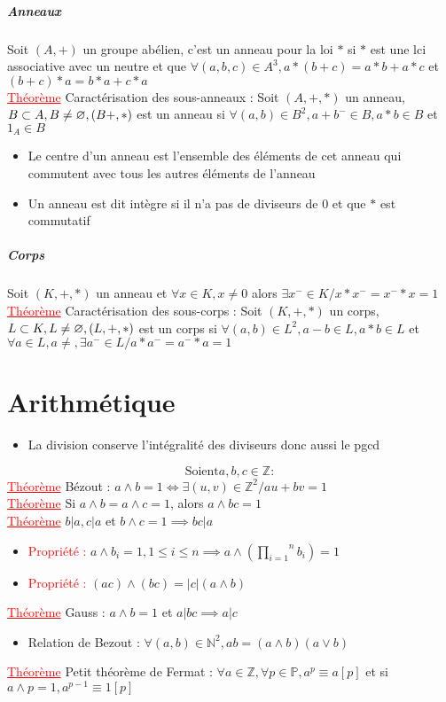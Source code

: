 \documentclass[a4paper, french]{article}
\newcommand{\N}{\mathbb{N}}
\newcommand{\Z}{\mathbb{Z}}
\newcommand{\p}{\wedge}
\newcommand{\produit}[2]{\overset{#2}{\underset{#1}{\prod}}}
\newcommand{\thm}{\textcolor{red}{\underline{Théorème} }}
\newcommand{\ppt}{\textcolor{red}{Propriété : }}
\begin{document}
	\subparagraph{Anneaux}
	Soit $(A,+)$ un groupe abélien, c'est un anneau pour la loi $*$ si $*$ est une lci associative avec un neutre et que $\forall (a,b,c)\in A^3, a*(b+c)=a*b+a*c$ et $ (b+c)*a=b*a+c*a$ \\
	 \thm Caractérisation des sous-anneaux : Soit $(A,+,*)$ un anneau, $B \subset A, B\neq \varnothing, \\ (B+,*)$ est un anneau si $\forall (a,b) \in B^2, a+b^-\in B, a*b \in B$ et $1_A \in B$
	\begin{itemize}
	  \item Le centre d'un anneau est l'ensemble des éléments de cet anneau qui commutent avec tous les autres éléments de l'anneau
	  \item Un anneau est dit intègre si il n'a pas de diviseurs de 0 et que $*$ est commutatif
	\end{itemize}

	\subparagraph{Corps}
	Soit $(K,+,*)$ un anneau et $\forall x \in K, x\neq0$ alors $\exists x^- \in K / x*x^-=x^-*x=1$
	\thm Caractérisation des sous-corps : Soit $(K,+,*)$ un corps, $L \subset K, L\neq \varnothing, \\ (L,+,*)$ est un corps si $\forall (a,b) \in L^2, a-b \in L, a*b \in L$ et $\forall a\in L, a\neq, \exists a^- \in L / a*a^-=a^-*a=1$

	\section{Arithmétique}
	\begin{itemize}
	  \item La division conserve l'intégralité des diviseurs donc aussi le pgcd
	\end{itemize}
	$$\text{Soient} a,b,c \in \Z :$$
	 \thm Bézout : $a \p b=1 \iff \exists (u,v) \in \Z^2 / au+bv=1$ \\
	 \thm Si $a \p b= a \p c = 1$, alors $a \p bc =1$ \\
	 \thm $b|a, c|a$ et $b\p c =1 \implies bc|a$
	\begin{itemize}
	  \item \ppt $a \p b_i=1, 1 \leqslant i \leqslant n \implies a\p (\produit{i=1}{n} b_i)=1$
	  \item \ppt $(ac)\p(bc)=|c|(a \p b)$
	\end{itemize}
	 \thm Gauss : $a \p b = 1$ et $a|bc \implies a|c$
	\begin{itemize}
	  \item Relation de Bezout : $\forall (a,b) \in \N^2, ab=(a \p b)(a \vee b)$
	\end{itemize}
	 \thm Petit théorème de Fermat : $\forall a \in \Z, \forall p \in \mathbb{P}, a^p \equiv a[p]$ et si $a \p p=1, a^{p-1} \equiv 1[p]$
\end{document}
